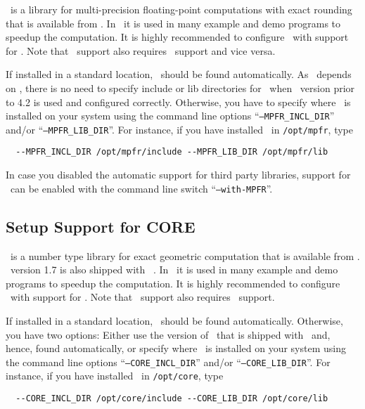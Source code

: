 \mpfr\ is a library for multi-precision floating-point computations
with exact rounding that is available from \mpfrpage. In \cgal\ it is
used in many example and demo programs to speedup the computation. It
is highly recommended to configure \cgal\ with support for \mpfr. Note
that \mpfr\ support also requires \gmp\ support and vice versa.

If installed in a standard location, \mpfr\ should be found
automatically. As \mpfr\ depends on \gmp, there is no need to specify
include or lib directories for \mpfr\ when \gmp\ version prior to 4.2
is used and configured correctly. Otherwise, you have to specify where
\mpfr\ is installed on your system using the command line options
``\texttt{--MPFR\_INCL\_DIR}'' and/or ``\texttt{--MPFR\_LIB\_DIR}''.
For instance, if you have installed \mpfr\ in \texttt{/opt/mpfr}, type
\begin{verbatim}
  --MPFR_INCL_DIR /opt/mpfr/include --MPFR_LIB_DIR /opt/mpfr/lib
\end{verbatim}

In case you disabled the automatic support for third party libraries,
support for \mpfr\ can be enabled with the command line switch
``\texttt{--with-MPFR}''.

\subsection{Setup Support for CORE\label{sec:core-setup}}

\core\ is a number type library for exact geometric computation that
is available from \corepage. \core\ version 1.7 is also shipped with
\cgal~\cgalrelease. In \cgal\ it is used in many example and demo
programs to speedup the computation. It is highly recommended to
configure \cgal\ with support for \core. Note that \core\ support also
requires \gmp\ support.

If installed in a standard location, \core\ should be found
automatically. Otherwise, you have two options: Either use the version
of \core\ that is shipped with \cgal\ and, hence, found automatically,
or specify where \core\ is installed on your system using the command
line options ``\texttt{--CORE\_INCL\_DIR}'' and/or
``\texttt{--CORE\_LIB\_DIR}''.  For instance, if you have installed
\core\ in \texttt{/opt/core}, type
\begin{verbatim}
  --CORE_INCL_DIR /opt/core/include --CORE_LIB_DIR /opt/core/lib
\end{verbatim}

